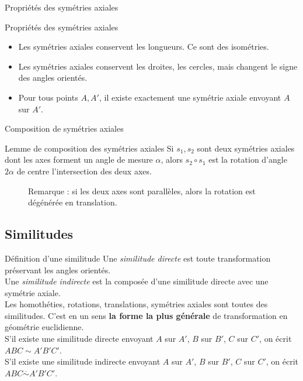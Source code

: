 \documentclass[french]{beamer}
\theoremstyle{plain}
\begin{document}
\begin{frame}{Propriétés des symétries axiales}
  \begin{exampleblock}{Propriétés des symétries axiales}
    \begin{itemize}
      \item Les symétries axiales conservent les longueurs. Ce sont des isométries.
      \item Les symétries axiales conservent les droites, les cercles, mais changent le signe des angles orientés.
      \item Pour tous points $ A, A'$, il existe exactement une symétrie axiale envoyant $ A $ sur $ A'$.
    \end{itemize}
  \end{exampleblock}
\end{frame}


\begin{frame}{Composition de symétries axiales}
  \begin{exampleblock}{Lemme de composition des symétries axiales}
    Si $ s_1, s_2 $ sont deux symétries axiales dont les axes forment un angle de mesure $ \alpha $, alors $ s_2 \circ s_1 $ est la rotation d'angle $ 2\alpha $ de centre l'intersection des deux axes.
  \end{exampleblock}
  \begin{figure}
    \centering
    \caption{Remarque : si les deux axes sont parallèles, alors la rotation est dégénérée en translation.}
  \end{figure}
\end{frame}


\subsection{Similitudes}
\begin{frame}{Définition d'une similitude}
  Une \textit{similitude directe} est toute transformation préservant les angles orientés. \\
  Une \textit{similitude indirecte} est la composée d'une similitude directe avec une symétrie axiale. \\
  Les homothéties, rotations, translations, symétries axiales sont toutes des similitudes. C'est en un sens \textbf{la forme la plus générale} de transformation en géométrie euclidienne. \\
  S'il existe une similitude directe envoyant $ A $ sur $ A' $, $ B $ sur $ B' $, $ C $ sur $ C' $, on écrit $ ABC \sim A'B'C' $. \\
  S'il existe une similitude indirecte envoyant $ A $ sur $ A' $, $ B $ sur $ B' $, $ C $ sur $ C' $, on écrit $ ABC \overline\sim A'B'C' $.
\end{frame}
\end{document}
